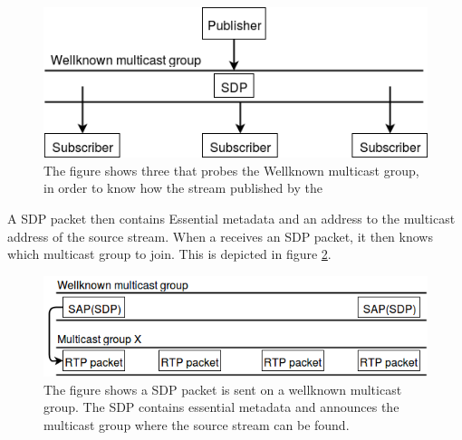 \begin{figure}[H]
	\centering
	\includegraphics[width=1\textwidth]{figures/session-announcement-probe}
	\caption{The figure shows three \subs{} that probes the Wellknown multicast group, in order to know how the stream published by the \pub{}} \label{fig:design:pubsub:session_probe}
\end{figure}

A SDP packet then contains Essential metadata and an address to the multicast address of the source stream. When a \subs{} receives an SDP packet, it then knows which multicast group to join. This is depicted in figure \ref{fig:design:sessionannouncement}.

\begin{figure}[H]
	\centering
	\includegraphics[width=\textwidth]{figures/sap-figure}
	 \caption{The figure shows a SDP packet is sent on a wellknown multicast group. The SDP contains essential metadata and announces the multicast group where the source stream can be found.}\label{fig:design:sessionannouncement}
\end{figure}



